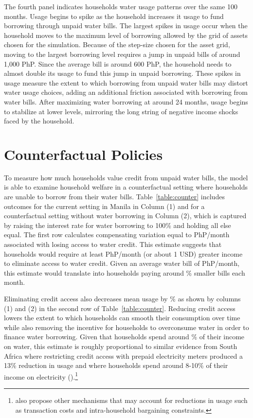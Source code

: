 \documentclass[12pt]{article}
\begin{document}
The fourth panel indicates households water usage patterns over the same 100 months.  Usage begins to spike as the household increases it usage to fund borrowing through unpaid water bills.  The largest spikes in usage occur when the household moves to the maximum level of borrowing allowed by the grid of assets chosen for the simulation.  Because of the step-size chosen for the asset grid, moving to the largest borrowing level requires a jump in unpaid bills of around 1,000 PhP.  Since the average bill is around 600 PhP, the household needs to almost double its usage to fund this jump in unpaid borrowing.  These spikes in usage measure the extent to which borrowing from unpaid water bills may distort water usage choices, adding an additional friction associated with borrowing from water bills.  After maximizing water borrowing at around 24 months, usage begins to stabilize at lower levels, mirroring the long string of negative income shocks faced by the household.  

\section{Counterfactual Policies}
To measure how much households value credit from unpaid water bills, the model is able to examine household welfare in a counterfactual setting where households are unable to borrow from their water bills.  Table~\ref{table:counter} includes outcomes for the current setting in Manila in Column (1) and for a counterfactual setting without water borrowing in Column (2), which is captured by raising the interest rate for water borrowing to 100\% and holding all else equal.  The first row calculates compensating variation equal to PhP/month associated with losing access to water credit.  This estimate suggests that households would require at least PhP/month (or about 1 USD) greater income to eliminate access to water credit.  Given an average water bill of PhP/month, this estimate would translate into households paying around \unskip\% smaller bills each month.  

Eliminating credit access also decreases mean usage by \unskip\% as shown by columns (1) and (2) in the second row of Table~\ref{table:counter}.  Reducing credit access lowers the extent to which households can smooth their consumption over time while also removing the incentive for households to overconsume water in order to finance water borrowing.  Given that households spend around \unskip\% of their income on water, this estimate is roughly proportional to similar evidence from South Africa where restricting credit access with prepaid electricity meters produced a 13\% reduction in usage and where households spend around 8-10\% of their income on electricity (\cite{jack2016charging}).\footnote{\cite{jack2016charging} also propose other mechanisms that may account for reductions in usage such as transaction costs and intra-household bargaining constraints.}
\end{document}
